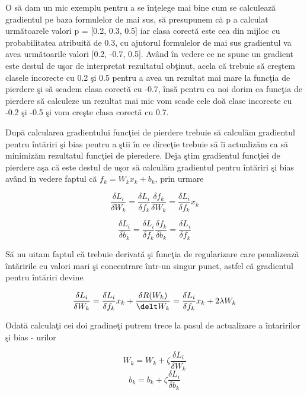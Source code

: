O s\u{a} dam un mic exemplu pentru a se \^{i}n\c{t}elege mai bine cum se calculeaz\u{a} gradientul pe baza formulelor de mai sus, s\u{a} presupunem c\u{a} p a calculat urm\u{a}toarele valori p = [0.2, 0.3, 0.5] iar clasa corect\u{a} este cea din mijloc cu probabilitatea atribuit\u{a} de 0.3, cu ajutorul formulelor de mai sus gradientul va avea urm\u{a}toarile valori [0.2, -0.7, 0.5]. Av\^{a}nd \^{i}n vedere ce ne spune un gradient este destul de u\c{s}or de interpretat rezultatul ob\c{t}inut, acela c\u{a} trebuie s\u{a} cre\c{s}tem clasele incorecte cu 0.2 \c{s}i 0.5 pentru a avea un rezultat mai mare la func\c{t}ia de pierdere \c{s}i s\u{a} scadem clasa corect\u{a} cu -0.7, \^{i}ns\u{a} pentru ca noi dorim ca func\c{t}ia de pierdere s\u{a} calculeze un rezultat mai mic vom scade cele do\u{a} clase incorecte cu -0.2 \c{s}i -0.5 \c{s}i vom cre\c{s}te clasa corect\u{a} cu 0.7.

\par

Dup\u{a} calcularea gradientului func\c{t}iei de pierdere trebuie s\u{a} calcul\u{a}m gradientul pentru \^{i}nt\u{a}riri \c{s}i bias pentru a \c{s}tii \^{i}n ce direc\c{t}ie trebuie s\u{a} \^{i}i actualiz\u{a}m ca s\u{a} minimiz\u{a}m rezultatul func\c{t}iei de pieredere. Deja \c{s}tim gradientul func\c{t}iei de pierdere a\c{s}a c\u{a} este destul de u\c{s}or s\u{a} calcul\u{a}m gradientul pentru \^{i}nt\u{a}riri \c{s}i bias av\^{a}nd \^{i}n vedere faptul c\u{a} $f_k = W_k x_k + b_k$, prin urmare

$$\frac{\delta L_i}{\delta W_k} = \frac{\delta L_i}{\delta f_k} \frac{\delta f_k}{\delta W_k} = \frac{\delta L_i}{\delta f_k} x_k$$

$$\frac{\delta L_i}{\delta b_k} = \frac{\delta L_i}{\delta f_k} \frac{\delta f_k}{\delta b_k} = \frac{\delta L_i}{\delta f_k}$$

S\u{a} nu uitam faptul c\u{a} trebuie derivat\u{a} \c{s}i func\c{t}ia de regularizare care penalizeaz\u{a} \^{i}nt\u{a}ririle cu valori mari \c{s}i concentrare \^{i}ntr-un singur punct, astfel c\u{a} gradientul pentru \^{i}nt\u{a}riri devine 

$$\frac{\delta L_i}{\delta W_k} = \frac{\delta L_i}{\delta f_k} x_k + \frac{\delta R(W_k)}{\delt W_k} = \frac{\delta L_i}{\delta f_k} x_k + 2 \lambda W_k$$

Odat\u{a} calcula\c{t}i cei doi gradine\c{t}i putrem trece la pasul de actualizare a \^{i}ntaririlor \c{s}i bias - urilor 

$$ W_k = W_k + \zeta \frac{\delta L_i}{\delta W_k} $$
$$b_k = b_k + \zeta \frac{\delta L_i}{\delta b_k} $$

